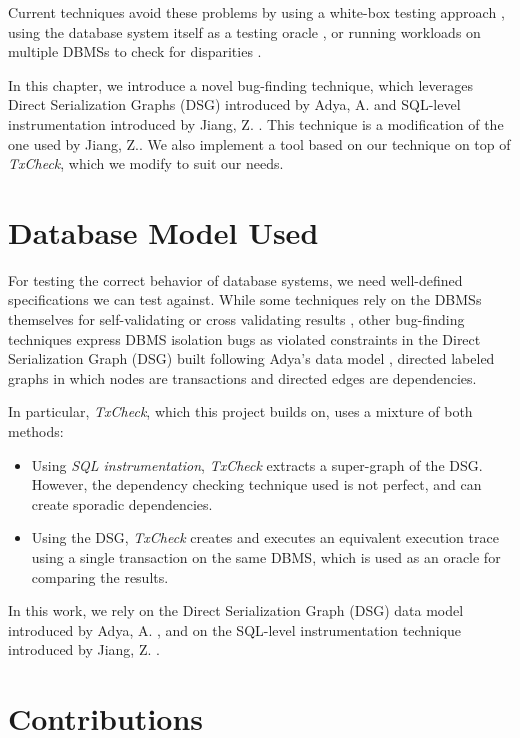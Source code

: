 Current techniques avoid these problems by using a white-box testing approach \cite{clark2024validating}, using the database system itself as a testing oracle \cite{jiang2023detecting}, or running workloads on multiple DBMSs to check for disparities \cite{cui2022differentially_ASE2022}.

In this chapter, we introduce a novel bug-finding technique, which leverages Direct Serialization Graphs (DSG) introduced by Adya, A. \cite{adya1999weak} and SQL-level instrumentation introduced by Jiang, Z. \cite{jiang2023detecting}. This technique is a modification of the one used by Jiang, Z.. We also implement a tool based on our technique on top of \textit{TxCheck}, which we modify to suit our needs.


\section{Database Model Used}

For testing the correct behavior of database systems, we need well-defined specifications we can test against. While some techniques rely on the DBMSs themselves for self-validating or cross validating results \cite{cui2022differentially_ASE2022}, other bug-finding techniques express DBMS isolation bugs as violated constraints in the Direct Serialization Graph (DSG) built following  Adya's data model \cite{jiang2023detecting,clark2024validating}, directed labeled graphs in which nodes are transactions and directed edges are dependencies.

In particular, \textit{TxCheck}, which this project builds on, uses a mixture of both methods:
\begin{itemize}
    \item Using \textit{SQL instrumentation}, \textit{TxCheck} extracts a super-graph of the DSG. However, the dependency checking technique used is not perfect, and can create sporadic dependencies.
    \item Using the DSG, \textit{TxCheck} creates and executes an equivalent execution trace using a single transaction on the same DBMS, which is used as an oracle for comparing the results.
\end{itemize}

In this work, we rely on the Direct Serialization Graph (DSG) data model introduced by Adya, A. \cite{adya1999weak}, and on the SQL-level instrumentation technique introduced by Jiang, Z. \cite{jiang2023detecting}.

\section{Contributions}

